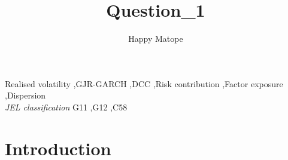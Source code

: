 \documentclass[11pt,preprint]{elsarticle}
\numberwithin{equation}{section}
\numberwithin{figure}{section}
\numberwithin{table}{section}
\begin{document}
\begin{frontmatter}  %

\title{Question\_1}





\author[Add1]{Happy Matope}





\address[Add1]{Stellenbosch University, South Africa}



\vspace{1cm}


\begin{keyword}
\footnotesize{
Realised volatility \sep GJR-GARCH \sep DCC \sep Risk contribution
\sep Factor exposure \sep Dispersion \\
\vspace{0.3cm}
}
\footnotesize{
\textit{JEL classification} G11 \sep G12 \sep C58
}
\end{keyword}



\vspace{0.5cm}

\end{frontmatter}

\setcounter{footnote}{0}



\pagestyle{fancy}
\chead{}
\lfoot{}
\lhead{}
\cfoot{}


\headsep 35pt %




\makeatletter
{}
\makeatother

\section{\texorpdfstring{Introduction
\label{Introduction}}{Introduction }}\label{introduction}
\end{document}
